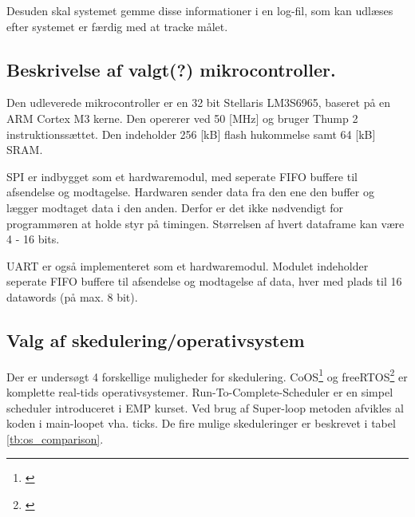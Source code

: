 
Desuden skal systemet gemme disse informationer i en log-fil, som kan udlæses efter systemet er færdig med at tracke målet. 


\subsection{Beskrivelse af valgt(?) mikrocontroller.}
Den udleverede mikrocontroller er en 32 bit Stellaris LM3S6965, baseret på en ARM Cortex M3 kerne. Den opererer ved 50 [MHz] og bruger Thump 2 instruktionssættet. Den indeholder 256 [kB] flash hukommelse samt 64 [kB] SRAM. 
\citep{lm3s6965}

SPI er indbygget som et hardwaremodul, med seperate FIFO buffere til afsendelse og modtagelse. Hardwaren sender data fra den ene den buffer og lægger modtaget data i den anden. Derfor er det ikke nødvendigt for programmøren at holde styr på timingen. Størrelsen af hvert dataframe kan være 4 - 16 bits. 

UART er også implementeret som et hardwaremodul. Modulet indeholder seperate FIFO buffere til afsendelse og modtagelse af data, hver med plads til 16 datawords (på max. 8 bit). 



\subsection{Valg af skedulering/operativsystem}
Der er undersøgt 4 forskellige muligheder for skedulering. CoOS\footnote{\citep{www.coocox.com/CoOS.htm}} og freeRTOS\footnote{\citep{freertos.org}} er komplette real-tids operativsystemer. 
Run-To-Complete-Scheduler er en simpel scheduler introduceret i EMP kurset. Ved brug af Super-loop metoden afvikles al koden i main-loopet vha. ticks.
De fire mulige skeduleringer er beskrevet i tabel \ref{tb:os_comparison}.


